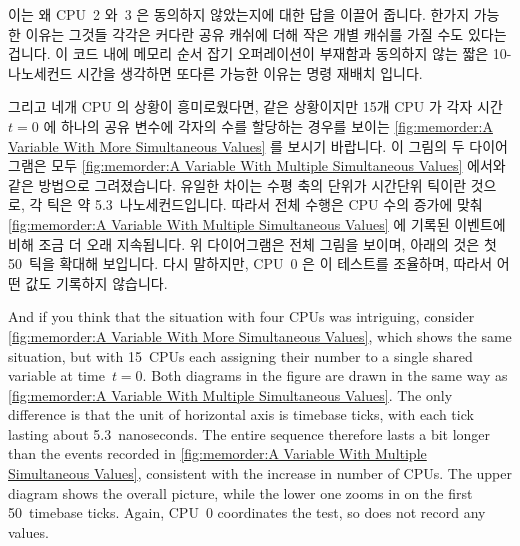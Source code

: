 {{	이는 왜 CPU~2 와~3 은 동의하지 않았는지에 대한 답을 이끌어 줍니다.
	한가지 가능한 이유는 그것들 각각은 커다란 공유 캐쉬에 더해 작은 개별
	캐쉬를 가질 수도 있다는 겁니다.
	이 코드 내에 메모리 순서 잡기 오퍼레이션이 부재함과 동의하지 않는 짧은
	10-나노세컨드 시간을 생각하면 또다른 가능한 이유는 명령 재배치 입니다.

}\QuickQuizEndE
}

그리고 네개 CPU 의 상황이 흥미로웠다면, 같은 상황이지만 15개 CPU 가 각자
시간~$t=0$ 에 하나의 공유 변수에 각자의 수를 할당하는 경우를 보이는
\cref{fig:memorder:A Variable With More Simultaneous Values} 를 보시기
바랍니다.
이 그림의 두 다이어그램은 모두
\cref{fig:memorder:A Variable With Multiple Simultaneous Values} 에서와 같은
방법으로 그려졌습니다.
유일한 차이는 수평 축의 단위가 시간단위 틱이란 것으로, 각 틱은 약
5.3~나노세컨드입니다.
따라서 전체 수행은 CPU 수의 증가에 맞춰
\cref{fig:memorder:A Variable With Multiple Simultaneous Values}
에 기록된 이벤트에 비해 조금 더 오래 지속됩니다.
위 다이어그램은 전체 그림을 보이며, 아래의 것은 첫 50~틱을 확대해 보입니다.
다시 말하지만, CPU~0 은 이 테스트를 조율하며, 따라서 어떤 값도 기록하지
않습니다.

\iffalse

And if you think that the situation with four CPUs was intriguing, consider
\cref{fig:memorder:A Variable With More Simultaneous Values},
which shows the same situation, but with 15~CPUs each assigning their
number to a single shared variable at time~$t=0$. Both diagrams in the
figure are drawn in the same way as
\cref{fig:memorder:A Variable With Multiple Simultaneous Values}.
The only difference is that the unit of horizontal axis is timebase ticks,
with each tick lasting about 5.3~nanoseconds.
The entire sequence therefore lasts a bit longer than the events recorded in
\cref{fig:memorder:A Variable With Multiple Simultaneous Values},
consistent with the increase in number of CPUs.
The upper diagram shows the overall picture, while the lower one zooms
in on the first 50~timebase ticks.
Again, CPU~0 coordinates the test, so does not record any values.

